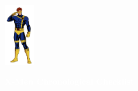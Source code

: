 \documentclass[12pt]{article}
\begin{document}
\newpage
{}

\begin{center}
    \vspace*{2cm}
    \includegraphics[width=0.1\textwidth]{cyclops.png}
    \vspace{0.3cm}

    {\Huge \textbf{\textcolor{white}{X-Men Chronological Checklist}}}
\end{center}
\end{document}
